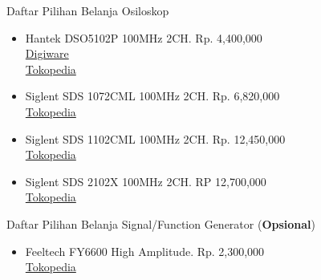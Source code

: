 \documentclass[table,dvipsnames]{beamer}
\begin{document}
	\begin{frame}
		\begin{exampleblock}{Daftar Pilihan Belanja Osiloskop}
			\begin{itemize}
				\item Hantek DSO5102P 100MHz 2CH. Rp. 4,400,000\\
				\href{https://digiwarestore.com/id/oscilloscopes/digital-storage-oscilloscope-hantek-dso5102p-osiloskop-100mhz-2-ch-641135.html}{Digiware}\\
				\href{https://www.tokopedia.com/digiware/digital-storage-oscilloscope-hantek-dso5102p-osiloskop-100mhz-2-ch}{Tokopedia}

				\item Siglent SDS 1072CML 100MHz 2CH. Rp. 6,820,000\\
				\href{https://www.tokopedia.com/tomas123/siglent-sds-1072cml}{Tokopedia}

				\item Siglent SDS 1102CML 100MHz 2CH. Rp. 12,450,000\\
				\href{https://www.tokopedia.com/tomas123/siglent-sds-1072cml}{Tokopedia}

				\item Siglent SDS 2102X 100MHz 2CH. RP 12,700,000\\
				\href{https://www.tokopedia.com/infinity226/super-phosphor-oscilloscope-siglent-sds2102x}{Tokopedia}
			\end{itemize}
		\end{exampleblock}

		\begin{exampleblock}{Daftar Pilihan Belanja Signal/Function Generator (\textbf{Opsional})}
			\begin{itemize}
				\item Feeltech FY6600 High Amplitude. Rp. 2,300,000\\
				\href{https://www.tokopedia.com/digilifeweb/signal-function-generator-feeltech-fy6600-60m-60mhz-dds-fy6600-60m}{Tokopedia}
			\end{itemize}
		\end{exampleblock}
	\end{frame}
\end{document}
